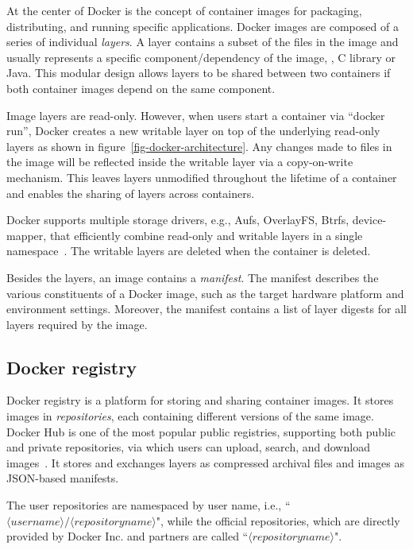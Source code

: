 At the center of Docker is the concept of container images for packaging,
distributing, and running specific applications.
Docker images are composed of a series of individual \emph{layers}.
A layer contains a subset of the files in the image and 
usually represents a specific component/dependency of the image, \eg, C library or
Java. This modular design allows layers to be shared between two containers if both
container images depend on the same component.
 
Image layers are read-only. However, when users start a
container via ``docker run'', Docker creates a new writable layer on top of the
underlying read-only layers as shown in figure~\ref{fig-docker-architecture}. Any changes made to files in the image will be
reflected inside the writable layer via a copy-on-write mechanism. This leaves layers
unmodified throughout the lifetime of a container and enables the sharing of
layers across containers.

Docker supports multiple storage drivers, e.g., Aufs, OverlayFS, Btrfs,
device-mapper, that efficiently combine read-only and writable layers
in a single namespace~\cite{docker-driver-eval}.
The writable layers are deleted when the container is deleted.

Besides the layers, an image contains a \emph{manifest}.
The manifest describes the various constituents of a Docker image, such as the
target hardware platform and environment settings.
%
Moreover, the manifest contains a list of layer digests for all layers required by the image.
\subsection{Docker registry}
\label{sec:docker-registry}

Docker registry is a platform for storing and sharing container
images. It stores images in \emph{repositories}, each containing
different versions of the same image.
%
Docker Hub is one of the most popular public registries,
supporting both public and private repositories,
via which users can upload, search, and download images~\cite{docker-hub}.
It stores and exchanges layers as compressed archival files and images
as JSON-based manifests.

The user repositories are namespaced by user name, i.e.,
``$\langle username\rangle/\langle repository name \rangle$",
while the official repositories, which
are directly provided by Docker Inc. and partners are called
``$\langle repository name \rangle$".
%

